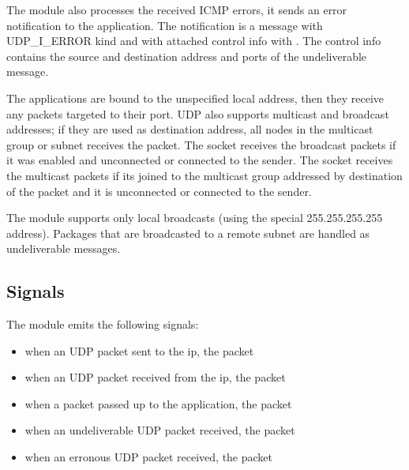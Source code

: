 The  module also processes the received ICMP errors, it sends an error
notification to the application. The notification is a message with UDP\_I\_ERROR
kind and with attached control info with .
The control info contains the source and destination address and ports of the undeliverable
message.

The applications are bound to the unspecified local address, then they receive any packets
targeted to their port. UDP also supports multicast and broadcast addresses; if they
are used as destination address, all nodes in the multicast group or subnet receives the packet.
The socket receives the broadcast packets if it was enabled and unconnected or connected to the
sender. The socket receives the multicast packets if its joined to the multicast group addressed
by destination of the packet and it is unconnected or connected to the sender.
\begin{note}
The  module supports only local broadcasts (using the special 255.255.255.255 address).
Packages that are broadcasted to a remote subnet are handled as undeliverable messages.
\end{note}

\subsection{Signals}

The  module emits the following signals:
\begin{itemize}
  \item {} when an UDP packet sent to the ip, the packet
  \item {} when an UDP packet received from the ip, the packet
  \item {} when a packet passed up to the application, the packet
  \item {} when an undeliverable UDP packet received, the packet
  \item {} when an erronous UDP packet received, the packet
\end{itemize}


